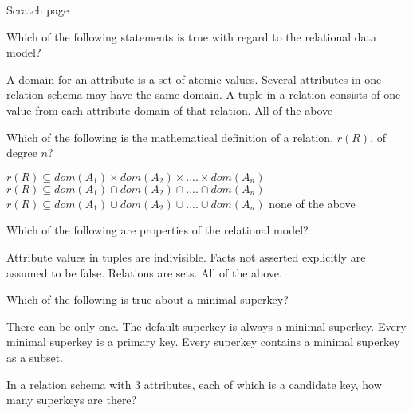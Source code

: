 \documentclass[10pt,a4paper]{exam}
\begin{document}
\newpage

Scratch page

\newpage

\begin{questions}

\question[4] Which of the following statements is true with regard to the relational data model?

\begin{choices}
\choice A domain for an attribute is a set of atomic values.
\choice Several attributes in one relation schema may have the same domain.
\choice A tuple in a relation consists of one value from each attribute domain of that relation.
\correctchoice All of the above
\end{choices}

\question[4] Which of the following is the mathematical definition of a relation, $r(R)$, of degree $n$?

\begin{choices}
\correctchoice $r(R) \subseteq dom(A_1) \times dom(A_2) \times .... \times dom(A_n)$
\choice $r(R) \subseteq dom(A_1) \cap dom(A_2) \cap .... \cap dom(A_n)$
\choice $r(R) \subseteq dom(A_1) \cup dom(A_2) \cup .... \cup dom(A_n)$
\choice none of the above
\end{choices}

\question[4] Which of the following are properties of the relational model?

\begin{choices}
\choice Attribute values in tuples are indivisible.
\choice Facts not asserted explicitly are assumed to be false.
\choice Relations are sets.
\correctchoice All of the above.
\end{choices}

\question[4] Which of the following is true about a minimal superkey?

\begin{choices}
\choice There can be only one.
\choice The default superkey is always a minimal superkey.
\choice Every minimal superkey is a primary key.
\correctchoice Every superkey contains a minimal superkey as a subset.
\end{choices}

\question[4] In a relation schema with 3 attributes, each of which is a candidate key, how many superkeys are there?

\begin{choices}
\end{choices}


\end{questions}
\end{document}
